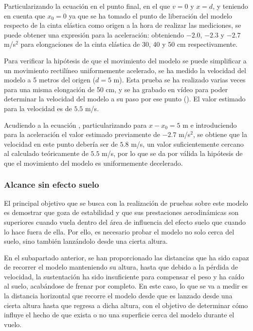 Particularizando la ecuación  en el punto final, en el que $v=0$ y $x=d$, y teniendo en cuenta que $x_0=0$ ya que se ha tomado el punto de liberación del modelo respecto de la cinta elástica como origen a la hora de realizar las mediciones, se puede obtener una expresión para la aceleración:
obteniendo $-2.0$, $-2.3$ y $-2.7$ m/s$^2$ para elongaciones de la cinta elástica de 30, 40 y 50 cm respectivamente.

Para verificar la hipótesis de que el movimiento del modelo se puede simplificar a un movimiento rectilíneo uniformemente acelerado, se ha medido la velocidad del modelo a 5 metros del origen ($d=5$ m). Esta prueba se ha realizado varias veces para una misma elongación de 50 cm, y se ha grabado en vídeo para poder determinar la velocidad del modelo a su paso por ese punto (). El valor estimado para la velocidad es de $5.5$ m/s.

Acudiendo a la ecuación , particularizando para $x-x_0=5$ m e introduciendo para la aceleración el valor estimado previamente de $-2.7$ m/s$^2$, se obtiene que la velocidad en este punto debería ser de $5.8$ m/s, un valor suficientemente cercano al calculado teóricamente de $5.5$ m/s, por lo que se da por válida la hipótesis de que el movimiento del modelo es uniformemente decelerado.



\subsubsection{Alcance sin efecto suelo}
\label{sec:tests:results:noge}

El principal objetivo que se busca con la realización de pruebas sobre este modelo es demostrar que goza de estabilidad y que sus prestaciones aerodinámicas son superiores cuando vuela dentro del área de influencia del efecto suelo que cuando lo hace fuera de ella. Por ello, es necesario probar el modelo no solo cerca del suelo, sino también lanzándolo desde una cierta altura.

En el subapartado anterior, se han proporcionado las distancias que ha sido capaz de recorrer el modelo manteniendo su altura, hasta que debido a la pérdida de velocidad, la sustentación ha sido insuficiente para compensar el peso y ha caído al suelo, acabándose de frenar por completo. En este caso, lo que se va a medir es la distancia horizontal que recorre el modelo desde que es lanzado desde una cierta altura hasta que regresa a dicha altura, con el objetivo de determinar cómo influye el hecho de que exista o no una superficie cerca del modelo durante el vuelo.


